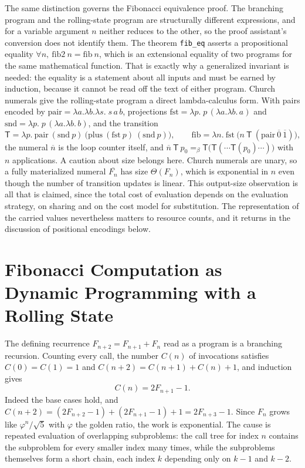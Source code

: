 \documentclass[11pt]{article}
\theoremstyle{definition}
\theoremstyle{remark}
\newcommand{\cn}[1]{\overline{#1}}
\newcommand{\Tm}{\mathsf{T}}
\begin{document}
The same distinction governs the Fibonacci equivalence proof. The branching program and the rolling-state program are structurally different expressions, and for a variable argument $n$ neither reduces to the other, so the proof assistant's conversion does not identify them. The theorem \texttt{fib\_eq} asserts a propositional equality $\forall n,\ \mathrm{fib2}\ n = \mathrm{fib}\ n$, which is an extensional equality of two programs for the same mathematical function. That is exactly why a generalized invariant is needed: the equality is a statement about all inputs and must be earned by induction, because it cannot be read off the text of either program. Church numerals give the rolling-state program a direct lambda-calculus form. With pairs encoded by $\mathrm{pair} = \lambda a.\lambda b.\lambda s.\; s\,a\,b$, projections $\mathrm{fst} = \lambda p.\; p\,(\lambda a.\lambda b.\,a)$ and $\mathrm{snd} = \lambda p.\; p\,(\lambda a.\lambda b.\,b)$, and the transition
\[
\Tm = \lambda p.\ \mathrm{pair}\ (\mathrm{snd}\ p)\ \big(\mathrm{plus}\ (\mathrm{fst}\ p)\ (\mathrm{snd}\ p)\big),
\qquad
\mathrm{fib} = \lambda n.\ \mathrm{fst}\ \big(n\ \Tm\ (\mathrm{pair}\ \cn{0}\ \cn{1})\big),
\]
the numeral $\cn{n}$ is the loop counter itself, and $\cn{n}\ \Tm\ p_0 =_\beta \Tm\big(\Tm(\cdots\Tm(p_0)\cdots)\big)$ with $n$ applications. A caution about size belongs here. Church numerals are unary, so a fully materialized numeral $\cn{F_n}$ has size $\Theta(F_n)$, which is exponential in $n$ even though the number of transition updates is linear. This output-size observation is all that is claimed, since the total cost of evaluation depends on the evaluation strategy, on sharing and on the cost model for substitution. The representation of the carried values nevertheless matters to resource counts, and it returns in the discussion of positional encodings below.

\section{Fibonacci Computation as Dynamic Programming with a Rolling State}\label{sec:fibdp}

The defining recurrence $F_{n+2} = F_{n+1} + F_n$ read as a program is a branching recursion. Counting every call, the number $C(n)$ of invocations satisfies $C(0) = C(1) = 1$ and $C(n+2) = C(n+1) + C(n) + 1$, and induction gives
\[
C(n) = 2F_{n+1} - 1 .
\]
Indeed the base cases hold, and $C(n+2) = (2F_{n+2} - 1) + (2F_{n+1} - 1) + 1 = 2F_{n+3} - 1$. Since $F_n$ grows like $\varphi^{n}/\sqrt{5}$ with $\varphi$ the golden ratio, the work is exponential. The cause is repeated evaluation of overlapping subproblems: the call tree for index $n$ contains the subproblem for every smaller index many times, while the subproblems themselves form a short chain, each index $k$ depending only on $k-1$ and $k-2$.
\end{document}
